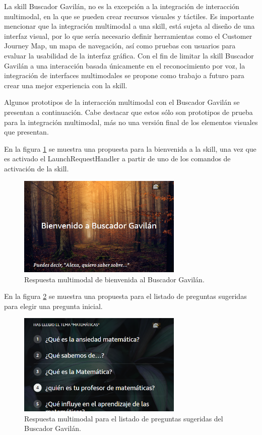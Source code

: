 La skill Buscador Gavilán, no es la excepción a la integración de interacción multimodal, en la que se pueden crear recursos visuales y táctiles. Es importante mencionar que la integración multimodal a una skill, está sujeta al diseño de una interfaz visual, por lo que sería necesario definir herramientas como el Customer Journey Map, un mapa de navegación, así como pruebas con usuarios para evaluar la usabilidad de la interfaz gráfica. Con el fin de limitar la skill Buscador Gavilán a una interacción basada únicamente en el reconocimiento por voz, la integración de interfaces multimodales se propone como trabajo a futuro para crear una mejor experiencia con la skill.

Algunos prototipos de la interacción multimodal con el Buscador Gavilán se presentan a continuación. Cabe destacar que estos sólo son prototipos de prueba para la integración multimodal, más no una versión final de los elementos visuales que presentan.

En la figura \ref{fig:52} se muestra una propuesta para la bienvenida a la skill, una vez que es activado el LaunchRequestHandler a partir de uno de los comandos de activación de la skill.

\begin{figure}
  \centering
  \includegraphics[width=0.70\textwidth]{Cap5/Figuras/Multimodal1.png}
  \caption{Respuesta multimodal de bienvenida al Buscador Gavilán.}
  \label{fig:52}
\end{figure}

En la figura \ref{fig:53} se muestra una propuesta para el listado de preguntas sugeridas para elegir una pregunta inicial.

\begin{figure}
  \centering
  \includegraphics[width=0.70\textwidth]{Cap5/Figuras/Multimodal2.png}
  \caption{Respuesta multimodal para el listado de preguntas sugeridas del Buscador Gavilán.}
  \label{fig:53}
\end{figure}

